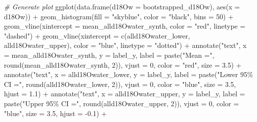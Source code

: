 \documentclass[
]{article}
\newenvironment{Shaded}{\begin{snugshade}}{\end{snugshade}}
\newcommand{\AttributeTok}[1]{\textcolor[rgb]{0.77,0.63,0.00}{#1}}
\newcommand{\CommentTok}[1]{\textcolor[rgb]{0.56,0.35,0.01}{\textit{#1}}}
\newcommand{\DecValTok}[1]{\textcolor[rgb]{0.00,0.00,0.81}{#1}}
\newcommand{\FloatTok}[1]{\textcolor[rgb]{0.00,0.00,0.81}{#1}}
\newcommand{\FunctionTok}[1]{\textcolor[rgb]{0.00,0.00,0.00}{#1}}
\newcommand{\NormalTok}[1]{#1}
\newcommand{\SpecialCharTok}[1]{\textcolor[rgb]{0.00,0.00,0.00}{#1}}
\newcommand{\StringTok}[1]{\textcolor[rgb]{0.31,0.60,0.02}{#1}}
\begin{document}
\begin{Shaded}
\begin{Highlighting}[]
\CommentTok{\# Generate plot}
\FunctionTok{ggplot}\NormalTok{(}\FunctionTok{data.frame}\NormalTok{(}\AttributeTok{d18Ow =}\NormalTok{ bootstrapped\_d18Ow), }\FunctionTok{aes}\NormalTok{(}\AttributeTok{x =}\NormalTok{ d18Ow)) }\SpecialCharTok{+}
  \FunctionTok{geom\_histogram}\NormalTok{(}\AttributeTok{fill =} \StringTok{"skyblue"}\NormalTok{, }\AttributeTok{color =} \StringTok{"black"}\NormalTok{, }\AttributeTok{bins =} \DecValTok{50}\NormalTok{) }\SpecialCharTok{+}
  \FunctionTok{geom\_vline}\NormalTok{(}\AttributeTok{xintercept =}\NormalTok{ mean\_alld18Owater\_synth, }\AttributeTok{color =} \StringTok{"red"}\NormalTok{, }\AttributeTok{linetype =} \StringTok{"dashed"}\NormalTok{) }\SpecialCharTok{+}
  \FunctionTok{geom\_vline}\NormalTok{(}\AttributeTok{xintercept =} \FunctionTok{c}\NormalTok{(alld18Owater\_lower, alld18Owater\_upper), }\AttributeTok{color =} \StringTok{"blue"}\NormalTok{, }\AttributeTok{linetype =} \StringTok{"dotted"}\NormalTok{) }\SpecialCharTok{+}
  \FunctionTok{annotate}\NormalTok{(}\StringTok{"text"}\NormalTok{, }\AttributeTok{x =}\NormalTok{ mean\_alld18Owater\_synth, }\AttributeTok{y =}\NormalTok{ label\_y,}
           \AttributeTok{label =} \FunctionTok{paste}\NormalTok{(}\StringTok{"Mean ="}\NormalTok{, }\FunctionTok{round}\NormalTok{(mean\_alld18Owater\_synth, }\DecValTok{2}\NormalTok{)),}
           \AttributeTok{vjust =} \DecValTok{0}\NormalTok{, }\AttributeTok{color =} \StringTok{"red"}\NormalTok{, }\AttributeTok{size =} \FloatTok{3.5}\NormalTok{) }\SpecialCharTok{+}
  \FunctionTok{annotate}\NormalTok{(}\StringTok{"text"}\NormalTok{, }\AttributeTok{x =}\NormalTok{ alld18Owater\_lower, }\AttributeTok{y =}\NormalTok{ label\_y,}
           \AttributeTok{label =} \FunctionTok{paste}\NormalTok{(}\StringTok{"Lower 95\% CI ="}\NormalTok{, }\FunctionTok{round}\NormalTok{(alld18Owater\_lower, }\DecValTok{2}\NormalTok{)),}
           \AttributeTok{vjust =} \DecValTok{0}\NormalTok{, }\AttributeTok{color =} \StringTok{"blue"}\NormalTok{, }\AttributeTok{size =} \FloatTok{3.5}\NormalTok{, }\AttributeTok{hjust =} \FloatTok{1.1}\NormalTok{) }\SpecialCharTok{+}
  \FunctionTok{annotate}\NormalTok{(}\StringTok{"text"}\NormalTok{, }\AttributeTok{x =}\NormalTok{ alld18Owater\_upper, }\AttributeTok{y =}\NormalTok{ label\_y,}
           \AttributeTok{label =} \FunctionTok{paste}\NormalTok{(}\StringTok{"Upper 95\% CI ="}\NormalTok{, }\FunctionTok{round}\NormalTok{(alld18Owater\_upper, }\DecValTok{2}\NormalTok{)),}
           \AttributeTok{vjust =} \DecValTok{0}\NormalTok{, }\AttributeTok{color =} \StringTok{"blue"}\NormalTok{, }\AttributeTok{size =} \FloatTok{3.5}\NormalTok{, }\AttributeTok{hjust =} \SpecialCharTok{{-}}\FloatTok{0.1}\NormalTok{) }\SpecialCharTok{+}

\end{Highlighting}
\end{Shaded}
\end{document}
